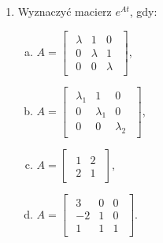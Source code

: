\documentclass{article}
\begin{document}
\begin{enumerate}
\item 
Wyznaczyć macierz $e^{At}$, gdy:
        \begin{enumerate}[a)]
            \item $A = \begin{bmatrix}\begin{array}{rrr} \lambda & 1 & 0\\ 0 & \lambda & 1\\ 0 & 0 & \lambda \end{array}\end{bmatrix}$,
            \item $A = \begin{bmatrix}\begin{array}{rrr} \lambda_{1} & 1 & 0\\ 0 & \lambda_{1} & 0\\ 0 & 0 & \lambda_{2} \end{array}\end{bmatrix}$,
            \item $A = \begin{bmatrix}\begin{array}{rr} 1 & 2\\ 2 & 1 \end{array}\end{bmatrix}$,
            \item $A = \begin{bmatrix}\begin{array}{rrr} 3 & 0 & 0\\ -2 & 1 & 0\\ 1 & 1 & 1 \end{array}\end{bmatrix}$.
        \end{enumerate}


\end{enumerate}
\end{document}
